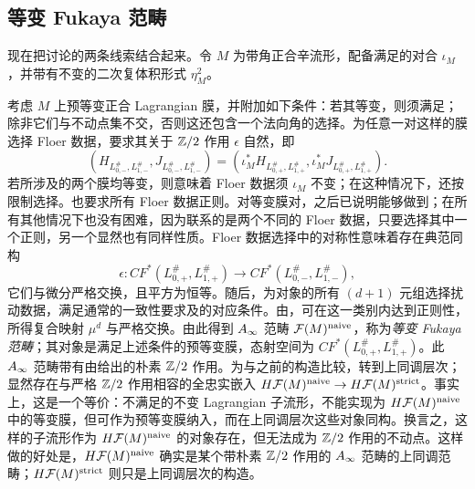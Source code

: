 \subsection{等变 Fukaya 范畴}\label{sec:14e}
现在把讨论的两条线索结合起来。令 $M$ 为带角正合辛流形，配备满足的对合 $\iota_M$，并带有不变的二次复体积形式 $\eta_M^2$。

考虑 $M$ 上预等变正合 Lagrangian 膜，并附加如下条件：若其等变，则须满足；除非它们与不动点集不交，否则这还包含一个法向角的选择。为任意一对这样的膜选择 Floer 数据，要求其关于 $\mathbb Z/2$ 作用 $\epsilon$ 自然，即
\begin{equation}\label{eq:14.14}
(H_{L_{0,-}^\#,L_{1,-}^\#},J_{L_{0,-}^\#,L_{1,-}^\#})
=(\iota_M^*H_{L_{0,+}^\#,L_{1,+}^\#},\iota_M^*J_{L_{0,+}^\#,L_{1,+}^\#}).
\end{equation}
若所涉及的两个膜均等变，则意味着 Floer 数据须 $\iota_M$ 不变；在这种情况下，还按限制选择。也要求所有 Floer 数据正则。对等变膜对，之后已说明能够做到；在所有其他情况下也没有困难，因为联系的是两个不同的 Floer 数据，只要选择其中一个正则，另一个显然也有同样性质。Floer 数据选择中的对称性意味着存在典范同构
\begin{equation}\label{eq:14.15}
\epsilon:CF^*(L_{0,+}^\#,L_{1,+}^\#)\longrightarrow CF^*(L_{0,-}^\#,L_{1,-}^\#),
\end{equation}
它们与微分严格交换，且平方为恒等。随后，为对象的所有 $(d+1)$ 元组选择扰动数据，满足通常的一致性要求及的对应条件。由，可在这一类别内达到正则性，所得复合映射 $\mu^d$ 与严格交换。由此得到 $A_\infty$ 范畴 $\mathcal F(M)^{\mathrm{naive}}$，称为\emph{等变 Fukaya 范畴}；其对象是满足上述条件的预等变膜，态射空间为 $CF^*(L_{0,+}^\#,L_{1,+}^\#)$。此 $A_\infty$ 范畴带有由给出的朴素 $\mathbb Z/2$ 作用。为与之前的构造比较，转到上同调层次；显然存在与严格 $\mathbb Z/2$ 作用相容的全忠实嵌入 $H\mathcal F(M)^{\mathrm{naive}}\to H\mathcal F(M)^{\mathrm{strict}}$。事实上，这是一个等价：不满足的不变 Lagrangian 子流形，不能实现为 $H\mathcal F(M)^{\mathrm{naive}}$ 中的等变膜，但可作为预等变膜纳入，而在上同调层次这些对象同构。换言之，这样的子流形作为 $H\mathcal F(M)^{\mathrm{naive}}$ 的对象存在，但无法成为 $\mathbb Z/2$ 作用的不动点。这样做的好处是，$H\mathcal F(M)^{\mathrm{naive}}$ 确实是某个带朴素 $\mathbb Z/2$ 作用的 $A_\infty$ 范畴的上同调范畴；$H\mathcal F(M)^{\mathrm{strict}}$ 则只是上同调层次的构造。

